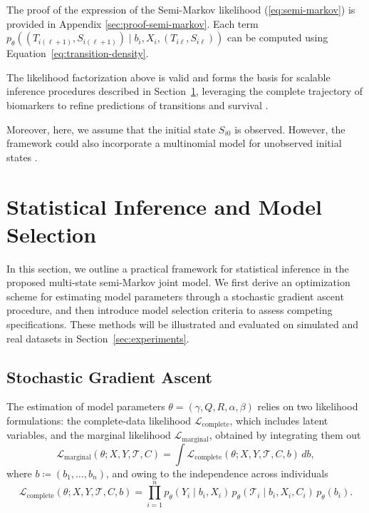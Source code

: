 \documentclass{sn-jnl}
\begin{document}
The proof of the expression of the Semi-Markov likelihood
(\ref{eq:semi-markov}) is provided in Appendix
\ref{sec:proof-semi-markov}. Each term $p_\theta\left((T_{i(\ell+1)}, S_{i(\ell+1)}) \mid b_i, X_i, (T_{i\ell}, S_{i\ell}) \right)$ can be computed using Equation~\ref{eq:transition-density}.

\bigbreak

The likelihood factorization above is valid and forms the basis for scalable inference procedures described in Section~\ref{sec:inference}, leveraging the complete trajectory of biomarkers to refine predictions of transitions and survival \citep{de2010mstate}.

Moreover, here, we assume that the initial state $S_{i0}$ is observed. However, the framework could also incorporate a multinomial model for unobserved initial states \citep{yiu2018clustered}.

\section{Statistical Inference and Model Selection} \label{sec:inference}

In this section, we outline a practical framework for statistical inference in the proposed multi-state semi-Markov joint model. We first derive an optimization scheme for estimating model parameters through a stochastic gradient ascent procedure, and then introduce model selection criteria to assess competing specifications. These methods will be illustrated and evaluated on simulated and real datasets in Section~\ref{sec:experiments}.

\subsection{Stochastic Gradient Ascent}

The estimation of model parameters $\theta = (\gamma, Q, R, \alpha, \beta)$ relies on two likelihood formulations: the complete-data likelihood $\mathcal{L}_{\mathrm{complete}}$, which includes latent variables, and the marginal likelihood $\mathcal{L}_\mathrm{marginal}$, obtained by integrating them out
\[
    \mathcal{L}_\mathrm{marginal}(\theta ; X, Y, \mathcal{T}, C) = \int \mathcal{L}_\mathrm{complete}(\theta; X, Y, \mathcal{T}, C, b) \,db,
\]
where $b \coloneqq (b_1, \dots, b_n)$, and owing to the independence across individuals
\[
    \mathcal{L}_\mathrm{complete}(\theta  ; X, Y, \mathcal{T}, C, b) = \prod_{i=1}^n p_\theta(Y_i \mid b_i, X_i) \, p_\theta(\mathcal{T}_i \mid b_i, X_i, C_i) \, p_\theta(b_i).
\]
\end{document}
